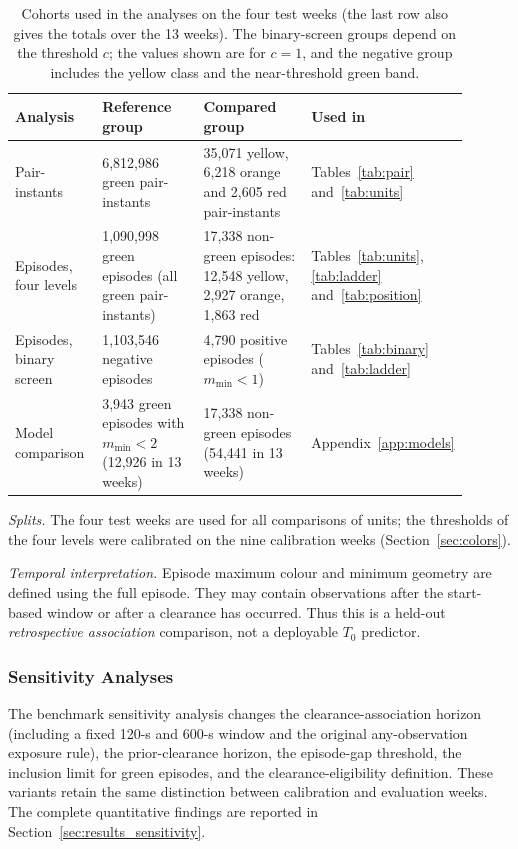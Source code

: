 \documentclass[aerospace,article,submit,moreauthors]{Definitions/mdpi}
\newcommand{\mmin}{m_{\min}}
\begin{document}
\begin{table}[t]
\caption{Cohorts used in the analyses on the four test weeks (the last row also gives the totals over the 13 weeks). The binary-screen groups depend on the threshold $c$; the values shown are for $c=1$, and the negative group includes the yellow class and the near-threshold green band.}\label{tab:cohorts}
\small\setlength{\tabcolsep}{4pt}
\begin{tabular}{@{}p{0.2\linewidth}p{0.26\linewidth}p{0.29\linewidth}p{0.15\linewidth}@{}}
\toprule
Analysis & Reference group & Compared group & Used in\\
\midrule
Pair-instants & 6,812,986 green pair-instants & 35,071 yellow, 6,218 orange and 2,605 red pair-instants & Tables~\ref{tab:pair} and~\ref{tab:units}\\
Episodes, four levels & 1,090,998 green episodes (all green pair-instants) & 17,338 non-green episodes: 12,548 yellow, 2,927 orange, 1,863 red & Tables~\ref{tab:units}, \ref{tab:ladder} and~\ref{tab:position}\\
Episodes, binary screen & 1,103,546 negative episodes & 4,790 positive episodes ($\mmin<1$) & Tables~\ref{tab:binary} and~\ref{tab:ladder}\\
Model comparison & 3,943 green episodes with $\mmin<2$ (12,926 in 13 weeks) & 17,338 non-green episodes (54,441 in 13 weeks) & Appendix~\ref{app:models}\\
\bottomrule
\end{tabular}
\end{table}

\emph{Splits.} The four test weeks are used for all comparisons of units; the thresholds of the four levels were calibrated on the nine calibration weeks (Section~\ref{sec:colors}).

\emph{Temporal interpretation.} Episode maximum colour and minimum geometry are defined using the full episode. They may contain observations after the start-based window or after a clearance has occurred. Thus this is a held-out \emph{retrospective association} comparison, not a deployable $T_0$ predictor.

\subsubsection{Sensitivity Analyses}
The benchmark sensitivity analysis changes the clearance-association horizon (including a fixed 120-s and 600-s window and the original any-observation exposure rule), the prior-clearance horizon, the episode-gap threshold, the inclusion limit for green episodes, and the clearance-eligibility definition. These variants retain the same distinction between calibration and evaluation weeks. The complete quantitative findings are reported in Section~\ref{sec:results_sensitivity}.
\end{document}
